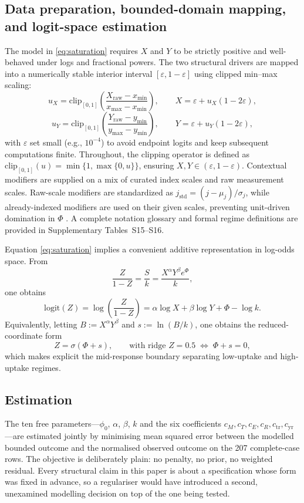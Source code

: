 \documentclass[11pt]{article}
\begin{document}
\subsection*{Data preparation, bounded-domain mapping, and logit-space estimation}\label{sec:model-fitting}
The model in \eqref{eq:saturation} requires $X$ and $Y$ to be strictly positive and well-behaved under logs and fractional powers. The two structural drivers are mapped into a numerically stable interior interval $[\varepsilon,1-\varepsilon]$ using clipped min--max scaling:
\begin{equation}
\label{eq:x_map}
u_X=\mathrm{clip}_{[0,1]}\!\left(\frac{X_{\mathrm{raw}}-x_{\min}}{x_{\max}-x_{\min}}\right),\qquad
X=\varepsilon+u_X(1-2\varepsilon),
\end{equation}
\begin{equation}
\label{eq:y_map}
u_Y=\mathrm{clip}_{[0,1]}\!\left(\frac{Y_{\mathrm{raw}}-y_{\min}}{y_{\max}-y_{\min}}\right),\qquad
Y=\varepsilon+u_Y(1-2\varepsilon),
\end{equation}
with $\varepsilon$ set small (e.g., $10^{-4}$) to avoid endpoint logits and keep subsequent computations finite. Throughout, the clipping operator is defined as $\mathrm{clip}_{[0,1]}(u)=\min\{1,\allowbreak\max\{0,u\}\}$, ensuring $X,Y\in(\varepsilon,1-\varepsilon)$.
Contextual modifiers are supplied on a mix of curated index scales and raw measurement scales. Raw-scale modifiers are standardized as $j_{\mathrm{std}}=(j-\mu_j)/\sigma_j$, while already-indexed modifiers are used on their given scales, preventing unit-driven domination in $\Phi$ \parencite{Hastie2009ESL}.
A complete notation glossary and formal regime definitions are provided in Supplementary Tables~S15--S16.

Equation \eqref{eq:saturation} implies a convenient additive representation in log-odds space. From
\[
\frac{Z}{1-Z}=\frac{S}{k}=\frac{X^{\alpha}Y^{\beta}e^{\Phi}}{k},
\]
one obtains
\begin{equation}
\label{eq:logit}
\mathrm{logit}(Z)
=\log\!\left(\frac{Z}{1-Z}\right)
=\alpha\log X+\beta\log Y+\Phi-\log k.
\end{equation}
Equivalently, letting $B:=X^{\alpha}Y^{\beta}$ and $s:=\ln(B/k)$, one obtains the reduced-coordinate form
\[
Z=\sigma(\Phi+s),
\qquad \text{with ridge } Z=0.5 \;\Leftrightarrow\; \Phi+s=0,
\]
which makes explicit the mid-response boundary separating low-uptake and high-uptake regimes.
\subsection*{Estimation}\label{sec:estimation}
The ten free parameters---$\phi_0$, $\alpha$, $\beta$, $k$ and the six coefficients $c_M,c_T,c_E,c_R,c_{\mathrm{tr}},c_{\mathrm{yr}}$---are estimated jointly by minimising mean squared error between the modelled bounded outcome and the normalised observed outcome on the \num{207} complete-case rows. The objective is deliberately plain: no penalty, no prior, no weighted residual. Every structural claim in this paper is about a specification whose form was fixed in advance, so a regulariser would have introduced a second, unexamined modelling decision on top of the one being tested.
\end{document}
